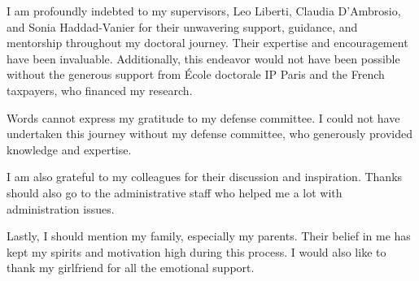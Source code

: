 
\begin{acknowledgements}      



I am profoundly indebted to my supervisors, Leo Liberti, Claudia D’Ambrosio, and Sonia Haddad-Vanier for their unwavering support, guidance, and mentorship throughout my doctoral journey. Their expertise and encouragement have been invaluable.
Additionally, this endeavor would not have been possible without the generous support from École doctorale IP Paris and the French taxpayers, who financed my research.

Words cannot express my gratitude to my defense committee. I could not have undertaken this journey without my defense committee, who generously provided knowledge and expertise.

I am also grateful to my colleagues for their discussion and inspiration. Thanks should also go to the administrative staff who helped me a lot with administration issues.

Lastly, I should mention my family, especially my parents. Their belief in me has kept my spirits and motivation high during this process. I would also like to thank my girlfriend for all the emotional support.





\end{acknowledgements}
